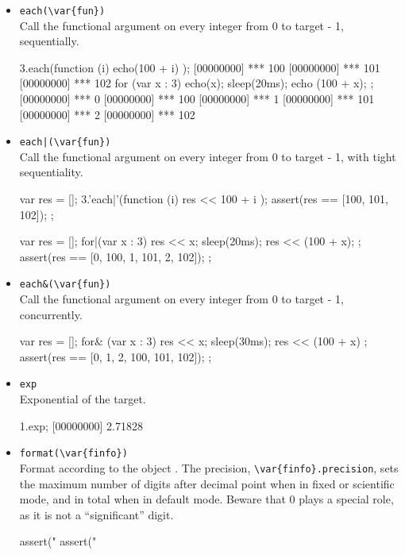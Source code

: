 \begin{itemize}
\item \lstinline|each(\var{fun})|\\
  Call the functional argument  on every integer from 0 to
  target - 1, sequentially.
\begin{urbiscript}[firstnumber=last]
3.each(function (i) { echo(100 + i) });
[00000000] *** 100
[00000000] *** 101
[00000000] *** 102
for (var x : 3) { echo(x); sleep(20ms); echo (100 + x); };
[00000000] *** 0
[00000000] *** 100
[00000000] *** 1
[00000000] *** 101
[00000000] *** 2
[00000000] *** 102
\end{urbiscript}

\item \lstinline'each|(\var{fun})'\\
  Call the functional argument  on every integer from 0 to
  target - 1, with tight sequentiality.
\begin{urbiscript}[firstnumber=last]
{
  var res = [];
  3.'each|'(function (i) { res << 100 + i });
  assert(res == [100, 101, 102]);
};

{
  var res = [];
  for|(var x : 3) { res << x; sleep(20ms); res << (100 + x); };
  assert(res == [0, 100, 1, 101, 2, 102]);
};
\end{urbiscript}%

\item \lstinline|each&(\var{fun})|\\
  Call the functional argument  on every integer from 0 to
  target - 1, concurrently.
\begin{urbiscript}[firstnumber=last]
{
  var res = [];
  for& (var x : 3) { res << x; sleep(30ms); res << (100 + x) };
  assert(res == [0, 1, 2, 100, 101, 102]);
};
\end{urbiscript}%

\item \lstinline|exp|\\
  Exponential of the target.
\begin{urbiscript}[firstnumber=last]
1.exp;
[00000000] 2.71828
\end{urbiscript}

\item \lstinline|format(\var{finfo})|\\
  Format according to the  object .
  The precision, \lstinline|\var{finfo}.precision|, sets the maximum
  number of digits after decimal point when in fixed or scientific
  mode, and in total when in default mode.  Beware that 0 plays a
  special role, as it is not a ``significant'' digit.
\begin{urbiscript}[firstnumber=last]
assert("%
assert("%


\end{urbiscript}
\end{itemize}
